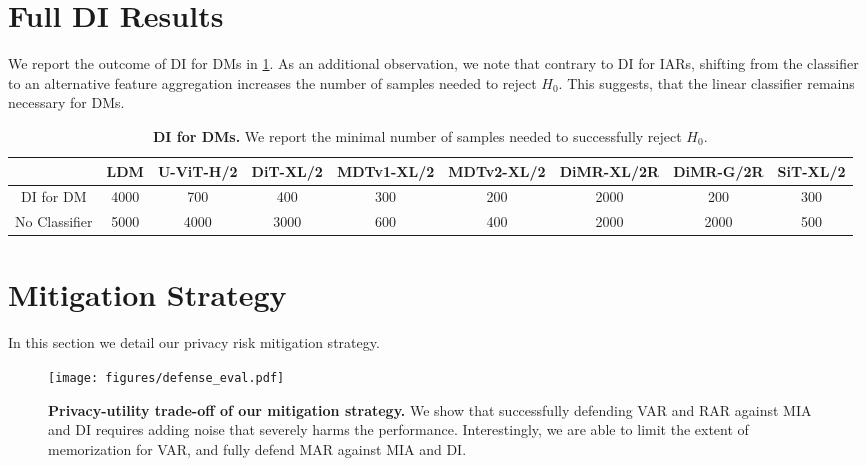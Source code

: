 \vspace{5cm}
\section{Full DI Results}
\label{app:full_di}

We report the outcome of DI for DMs in \cref{tab:di_dm}. As an additional observation, we note that contrary to DI for IARs, shifting from the classifier to an alternative feature aggregation increases the number of samples needed to reject $H_0$. This suggests, that the linear classifier remains
necessary for DMs.


\begin{table}[h!]
\caption{\textbf{DI for DMs.} We report the minimal number of samples needed to successfully reject $H_0$.}
    \centering
    \scriptsize
    \setlength{\tabcolsep}{3pt}
    \begin{tabular}{ccccccccc}
    \toprule
     & LDM & U-ViT-H/2 & DiT-XL/2 & MDTv1-XL/2 & MDTv2-XL/2 & DiMR-XL/2R & DiMR-G/2R & SiT-XL/2 \\
    \midrule
     DI for DM & 4000 & 700 & 400 & 300 & 200 & 2000 & 200 & 300 \\
    \midrule
     No Classifier & 5000 & 4000 & 3000 & 600 & 400 & 2000 & 2000 & 500 \\
    \bottomrule
    \end{tabular}
    \label{tab:di_dm}
\end{table}









\section{Mitigation Strategy}
\label{app:mitigation}


In this section we detail our privacy risk mitigation strategy.


\begin{figure}[h!]
    \centering
    \texttt{[image: figures/defense\_eval.pdf]}
    \caption{\textbf{Privacy-utility trade-off of our mitigation strategy.} We show that successfully defending VAR and RAR against MIA and DI requires adding noise that severely harms the performance. Interestingly, we are able to limit the extent of memorization for VAR, and fully defend MAR against MIA and DI.}
    \label{fig:defense}
\end{figure}


